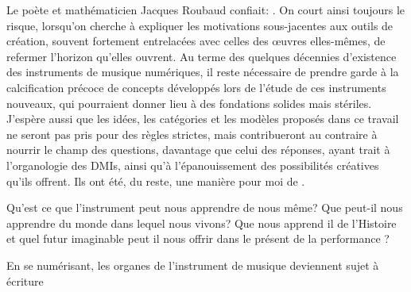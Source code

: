 


\noindent Le poète et mathématicien Jacques Roubaud confiait: . On court ainsi toujours le risque, lorsqu'on cherche à expliquer les motivations sous-jacentes aux outils de création, souvent fortement entrelacées avec celles des œuvres elles-mêmes, de refermer l'horizon qu'elles ouvrent. Au terme des quelques décennies d'existence des instruments de musique numériques, il reste nécessaire de prendre garde à la calcification précoce de concepts développés lors de l'étude de ces instruments nouveaux, qui pourraient donner lieu à des fondations solides mais stériles. J'espère aussi que les idées, les catégories et les modèles proposés dans ce travail ne seront pas pris pour des règles strictes, mais contribueront au contraire à nourrir le champ des questions, davantage que celui des réponses, ayant trait à l'organologie des \glspl{DMI}, ainsi qu'à l'épanouissement des possibilités créatives qu'ils offrent. Ils ont été, du reste, une manière pour moi de .


Qu'est ce que l'instrument peut nous apprendre de nous même? Que peut-il nous apprendre du monde dans lequel nous vivons? Que nous apprend il de l'Histoire et quel futur imaginable peut il nous offrir dans le présent de la performance ?


En se numérisant, les organes de l'instrument de musique deviennent sujet à écriture

